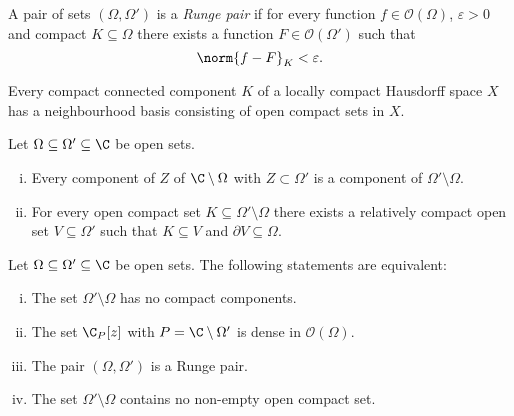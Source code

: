 \begin{definicija}
A pair of sets $(\Omega, \Omega')$ is a
\emph{Runge pair} if for every function
$f \in \mathcal{O}(\Omega)$, $\varepsilon > 0$ and compact
$K \subseteq \Omega$ there exists a function
$F \in \mathcal{O}(\Omega')$ such that
\[
\norm{f - F}_K < \varepsilon.
\]
\end{definicija}


\begin{izrek}
Every compact connected component $K$ of a locally compact
Hausdorff space $X$ has a neighbourhood basis consisting of open
compact sets in $X$.
\end{izrek}

\begin{lema}Let $\Omega \subseteq \Omega' \subseteq \C$ be open
sets.

\begin{enumerate}[i)]
\item Every component of $Z$ of $\C \setminus \Omega$ with
$Z \subset \Omega'$ is a component of $\Omega' \setminus \Omega$.
\item For every open compact set
$K \subseteq \Omega' \setminus \Omega$ there exists a relatively
compact open set $V \subseteq \Omega'$ such that $K \subseteq V$
and $\partial V \subseteq \Omega$.
\end{enumerate}
\end{lema}

\begin{izrek}
Let $\Omega \subseteq \Omega' \subseteq \C$ be open sets. The
following statements are equivalent:

\begin{enumerate}[i)]
\item The set $\Omega' \setminus \Omega$ has no compact components.
\item The set $\C_P[z]$ with $P = \C \setminus \Omega'$ is dense in
$\mathcal{O}(\Omega)$.
\item The pair $(\Omega, \Omega')$ is a Runge pair.
\item The set $\Omega' \setminus \Omega$ contains no non-empty open
compact set.
\end{enumerate}
\end{izrek}


